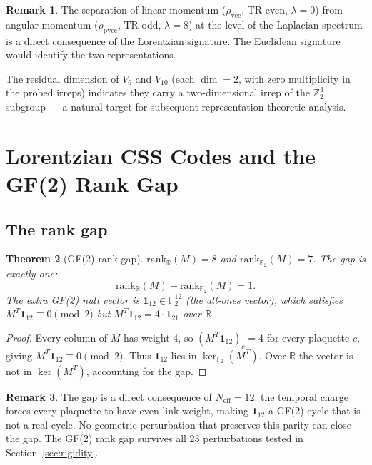\documentclass[12pt,a4paper]{article}
\theoremstyle{plain}
\newtheorem{theorem}{Theorem}[section]
\theoremstyle{definition}
\newtheorem{remark}[theorem]{Remark}
\newcommand{\R}{\mathbb{R}}
\newcommand{\Z}{\mathbb{Z}}
\newcommand{\GF}[1]{\mathbb{F}_{#1}}
\newcommand{\Neff}{N_{\mathrm{eff}}}
\newcommand{\rank}{\mathrm{rank}}
\newcommand{\rhovec}{\rho_{\mathrm{vec}}}
\newcommand{\rhopvec}{\rho_{\mathrm{pvec}}}
\begin{document}
\begin{remark}
  The separation of linear momentum ($\rhovec$, TR-even, $\lambda=0$)
  from angular momentum ($\rhopvec$, TR-odd, $\lambda=8$) at the level
  of the Laplacian spectrum is a direct consequence of the Lorentzian
  signature.  The Euclidean signature would identify the two representations.
\end{remark}

The residual dimension of $V_6$ and $V_{10}$ (each $\dim=2$, with zero
multiplicity in the probed irreps) indicates they carry a
two-dimensional irrep of the $\Z_2^3$ subgroup — a natural target for
subsequent representation-theoretic analysis.

\section{Lorentzian CSS Codes and the GF(2) Rank Gap}
\label{sec:css}

\subsection{The rank gap}

\begin{theorem}[GF(2) rank gap]
\label{thm:rankgap}
  $\rank_\R(M) = 8$ and $\rank_{\GF{2}}(M) = 7$.
  The gap is exactly one:
  \begin{equation}
    \rank_\R(M) - \rank_{\GF{2}}(M) = 1.
  \end{equation}
  The extra GF(2) null vector is $\mathbf{1}_{12} \in \GF{2}^{12}$
  (the all-ones vector), which satisfies $M^T \mathbf{1}_{12} \equiv 0
  \pmod{2}$ but $M^T \mathbf{1}_{12} = 4\cdot\mathbf{1}_{21}$ over $\R$.
\end{theorem}

\begin{proof}
  Every column of $M$ has weight 4, so $(M^T \mathbf{1}_{12})_c = 4$ for
  every plaquette $c$, giving $M^T \mathbf{1}_{12} \equiv 0 \pmod{2}$.
  Thus $\mathbf{1}_{12}$ lies in $\ker_{\GF{2}}(M^T)$.  Over $\R$ the
  vector is not in $\ker(M^T)$, accounting for the gap.
\end{proof}

\begin{remark}
  The gap is a direct consequence of $\Neff = 12$: the temporal
  charge forces every plaquette to have even link weight, making
  $\mathbf{1}_{12}$ a GF(2) cycle that is not a real cycle.
  No geometric perturbation that preserves this parity can close the gap.
  The GF(2) rank gap survives all 23 perturbations tested in
  Section~\ref{sec:rigidity}.
\end{remark}
\end{document}
